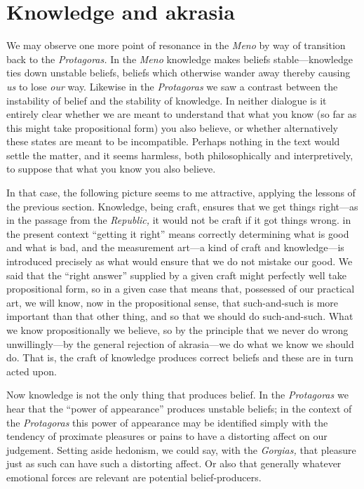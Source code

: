 \documentclass[11pt]{amsart}
\begin{document}
\section{Knowledge and akrasia}


We may observe one more point of resonance in the \emph{Meno} by way of transition back to the \emph{Protagoras.} In the \emph{Meno} knowledge makes beliefs stable---knowledge ties down unstable beliefs, beliefs which otherwise wander away thereby causing \emph{us} to lose \emph{our} way. Likewise in the \emph{Protagoras} we saw a contrast between the instability of belief and the stability of knowledge. In neither dialogue is it entirely clear whether we are meant to understand that what you know (so far as this might take propositional form) you also believe, or whether alternatively these states are meant to be incompatible. Perhaps nothing in the text would settle the matter, and it seems harmless, both philosophically and interpretively, to suppose that what you know you also believe.


In that case, the following picture seems to me attractive, applying the lessons of the previous section. Knowledge, being craft, ensures that we get things right---as in the passage from the \emph{Republic,} it would not be craft if it got things wrong. in the present context ``getting it right'' means correctly determining what is good and what is bad, and the measurement art---a kind of craft and knowledge---is introduced precisely as what would ensure that we do not mistake our good. We said that the ``right answer'' supplied by a given craft might perfectly well take propositional form, so in a given case that means that, possessed of our practical art, we will know, now in the propositional sense, that such-and-such is more important than that other thing, and so that we should do such-and-such. What we know propositionally we believe, so by the principle that we never do wrong unwillingly---by the general rejection of akrasia---we do what we know we should do. That is, the craft of knowledge produces correct beliefs and these are in turn acted upon.


Now knowledge is not the only thing that produces belief. In the \emph{Protagoras} we hear that the ``power of appearance'' produces unstable beliefs; in the context of the \emph{Protagoras} this power of appearance may be identified simply with the tendency of proximate pleasures or pains to have a distorting affect on our judgement. Setting aside hedonism, we could say, with the \emph{Gorgias,} that pleasure just as such can have such a distorting affect. Or also that generally whatever emotional forces are relevant are potential belief-producers.
\end{document}
